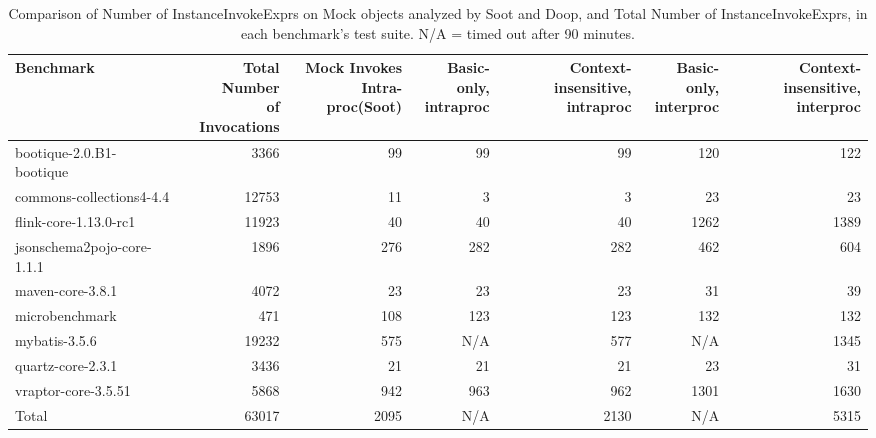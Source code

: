 \begin{table*}
	\centering
	\caption{Comparison of Number of InstanceInvokeExprs on Mock objects analyzed by Soot and Doop, and Total Number of InstanceInvokeExprs, in each benchmark's test suite. N/A = timed out after 90 minutes.}
	\begin{tabular}{lrrrrrr}
		\toprule
		Benchmark & \thead{Total Number \\ of Invocations} & \thead{Mock Invokes \\ Intra-proc(Soot)} & \thead{Basic-only, \\ intraproc} & \thead{Context-insensitive, \\ intraproc} & \thead{Basic-only, \\ interproc} & \thead{Context-insensitive, \\ interproc} \\
		\midrule
		bootique-2.0.B1-bootique           		&  3366     &  99   & 99    & 99   & 120   & 122    \\
		commons-collections4-4.4       			&  12753    &  11   & 3     &  3    & 23   & 23   \\
		flink-core-1.13.0-rc1           		&  11923    &  40   & 40    & 40   & 1262  & 1389   \\
		jsonschema2pojo-core-1.1.1           	&  1896     &  276  & 282   & 282  & 462   & 604   \\
		maven-core-3.8.1           				&  4072     &  23   & 23    & 23  & 31     & 39  \\
		microbenchmark         		  			&  471      &  108  & 123   & 123  & 132   & 132   \\
		mybatis-3.5.6         		  			&  19232    &  575  & N/A   & 577 &  N/A   & 1345     \\
		quartz-core-2.3.1       	  			&  3436     &  21   & 21    & 21   & 23    & 31    \\
		vraptor-core-3.5.51        	  			&  5868     &  942  & 963   & 962  & 1301  & 1630   \\
		\bottomrule
		Total        	  						&  63017    & 2095  & N/A   & 2130  & N/A  & 5315   \\
	\end{tabular}
	\label{tab:invokes}
\end{table*}

